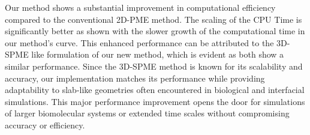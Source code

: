 Our method shows a substantial improvement in computational efficiency compared to the conventional \ac{2D-PME} method. The scaling of the CPU Time is significantly better as shown with the slower growth of the computational time in our method's curve. This enhanced performance can be attributed to the 3D-\ac{SPME} like formulation of our new method, which is evident as both show a similar performance. Since the 3D-SPME method is known for its scalability and accuracy, our implementation matches its performance while providing adaptability to slab-like geometries often encountered in biological and interfacial simulations. This major performance improvement opens the door for simulations of larger biomolecular systems or extended time scales without compromising accuracy or efficiency.
